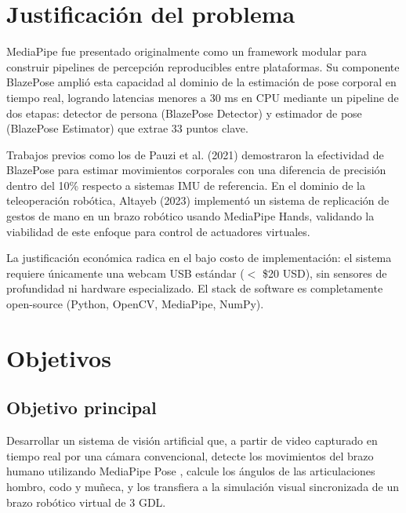 \section{Justificación del problema}
MediaPipe fue presentado originalmente como un framework modular para construir pipelines de percepción reproducibles entre plataformas. Su componente BlazePose amplió esta capacidad al dominio de la estimación de pose corporal en tiempo real, logrando latencias menores a 30 ms en CPU mediante un pipeline de dos etapas: detector de persona (BlazePose Detector) y estimador de pose (BlazePose Estimator) que extrae 33 puntos clave. \cite{Bazarevskyetal2020} \cite{Lugaresietal2019}

Trabajos previos como los de Pauzi et al. (2021) demostraron la efectividad de BlazePose para estimar movimientos corporales con una diferencia de precisión dentro del 10\% respecto a sistemas IMU de referencia. En el dominio de la teleoperación robótica, Altayeb (2023) implementó un sistema de replicación de gestos de mano en un brazo robótico usando MediaPipe Hands, validando la viabilidad de este enfoque para control de actuadores virtuales. \cite{Pauzietal2021} \cite{Altayeb2023}

La justificación económica radica en el bajo costo de implementación: el sistema requiere únicamente una webcam USB estándar ($<$ \$20 USD), sin sensores de profundidad ni hardware especializado. El stack de software es completamente open-source (Python, OpenCV, MediaPipe, NumPy).

\section{Objetivos}

\subsection{Objetivo principal}
Desarrollar un sistema de visión artificial que, a partir de video capturado en tiempo real por una cámara convencional, detecte los movimientos del brazo humano utilizando MediaPipe Pose \cite{Bazarevskyetal2020} \cite{Lugaresietal2019}, calcule los ángulos de las articulaciones hombro, codo y muñeca, y los transfiera a la simulación visual sincronizada de un brazo robótico virtual de 3 GDL.

